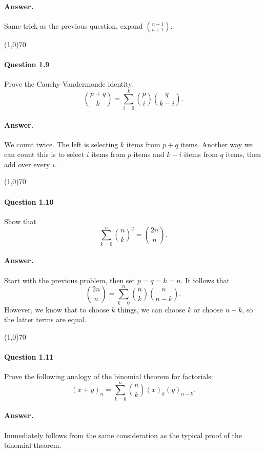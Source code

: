 \paragraph{Answer.} Same trick as the previous question, expand $\binom{n+1}{a+1}$.

 \begin{center}
 	\line(1,0){70}
 \end{center}

\paragraph{Question 1.9} Prove the Cauchy-Vandermonde identity:
$$\binom{p+q}{k}=\sum_{i=0}^k\binom{p}{i}\binom{q}{k-i}.$$

\paragraph{Answer.} We count twice. The left is selecting $k$ items from $p+q$ items. Another way we can count this is to select $i$ items from $p$ items and $k-i$ items from $q$ items, then add over every $i$.

\begin{center}
	\line(1,0){70}
\end{center}

\paragraph{Question 1.10} Show that
$$\sum_{k=0}^n\binom{n}{k}^2=\binom{2n}{n}.$$

\paragraph{Answer.} Start with the previous problem, then set $p=q=k=n$. It follows that
$$\binom{2n}{n}=\sum_{k=0}^n\binom{n}{k}\binom{n}{n-k}.$$ However, we know that to choose $k$ things, we can choose $k$ or choose $n-k$, so the latter terms are equal.

\begin{center}
	\line(1,0){70}
\end{center}

\paragraph{Question 1.11} Prove the following analogy of the binomial theorem for factorials:
$$(x+y)_n = \sum_{k=0}^n\binom{n}{k}(x)_k(y)_{n-k}.$$

\paragraph{Answer.} Immediately follows from the same consideration as the typical proof of the binomial theorem.